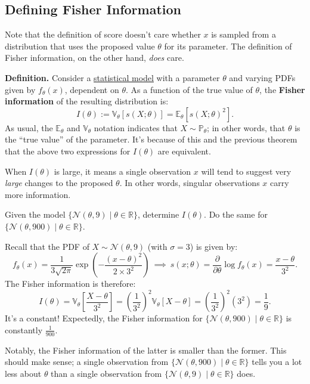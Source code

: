 \subsection{Defining Fisher Information}

Note that the definition of score doesn't care whether $x$ is sampled
from a distribution that uses the proposed value $\theta$ for its parameter.
The definition of Fisher information, on the other hand, \emph{does} care.

\textbf{Definition.} Consider a \underline{statistical model} with a parameter $\theta$
and varying PDFs given by $f_{\theta}(x)$, dependent on $\theta$.
As a function of the true value of $\theta$, the \textbf{Fisher information}
of the resulting distribution is:
\[ I(\theta) := \mathbb{V}_{\theta}\left[s(X; \theta)\right]
= \mathbb{E}_{\theta}[s(X; \theta)^2]. \]
As usual, the $\mathbb{E}_{\theta}$ and $\mathbb{V}_{\theta}$ notation
indicates that $X \sim \mathbb{P}_{\theta}$; in other words, that $\theta$ is the ``true value''
of the parameter.  It's because of this and the previous theorem
that the above two expressions for $I(\theta)$ are equivalent.

When $I(\theta)$ is large,
it means a single observation $x$ will tend to suggest
very \emph{large} changes to the proposed $\theta$.
In other words, singular observations $x$ carry more information.

\begin{problem}
    Given the model $\{\mathcal{N}(\theta, 9) \mid \theta \in \mathbb{R}\}$,
    determine $I(\theta)$.  Do the same for $\{\mathcal{N}(\theta, 900) \mid \theta \in \mathbb{R}\}$.
\end{problem}

\begin{solution}
    Recall that the PDF of $X \sim \mathcal{N}(\theta, 9)$ (with $\sigma = 3$) is given by:
    \[ f_{\theta}(x) = \frac{1}{3\sqrt{2\pi}} \exp\left(-\frac{(x - \theta)^2}{2 \times 3^2}\right)
    ~ \implies ~ s(x; \theta) = \frac{\partial}{\partial\theta} \log f_{\theta}(x)
    = \frac{x - \theta}{3^2}. \]
    The Fisher information is therefore:
    \[ I(\theta) = \mathbb{V}_{\theta}\left[ \frac{X - \theta}{3^2} \right]
    = \left(\frac{1}{3^2}\right)^2 \mathbb{V}_{\theta}[X - \theta]
    = \left(\frac{1}{3^2}\right)^2(3^2) = \frac{1}{9}. \]
    It's a constant!
    Expectedly, the Fisher information for $\{\mathcal{N}(\theta, 900) \mid \theta \in \mathbb{R}\}$
    is constantly $\frac{1}{900}$.
    
    Notably, the Fisher information of the latter is smaller than the former.
    This should make sense; a single observation from
    $\{\mathcal{N}(\theta, 900) \mid \theta \in \mathbb{R}\}$
    tells you a lot less about $\theta$ than a single observation from
    $\{\mathcal{N}(\theta, 9) \mid \theta \in \mathbb{R}\}$ does.
\end{solution}

